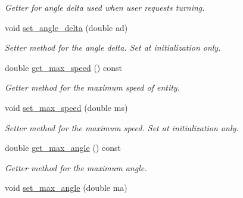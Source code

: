 \begin{DoxyCompactItemize}
\begin{DoxyCompactList}\small\item\em Getter for angle delta used when user requests turning. \end{DoxyCompactList}\item 
\mbox{\label{class_motion_handler_a8c2811ddf1a0f077fec829c460009286}} 
void \mbox{\hyperlink{class_motion_handler_a8c2811ddf1a0f077fec829c460009286}{set\+\_\+angle\+\_\+delta}} (double ad)
\begin{DoxyCompactList}\small\item\em Setter method for the angle delta. Set at initialization only. \end{DoxyCompactList}\item 
\mbox{\label{class_motion_handler_a71e2e4cdddfb8c49eb18cf41878a08c0}} 
double \mbox{\hyperlink{class_motion_handler_a71e2e4cdddfb8c49eb18cf41878a08c0}{get\+\_\+max\+\_\+speed}} () const
\begin{DoxyCompactList}\small\item\em Getter method for the maximum speed of entity. \end{DoxyCompactList}\item 
\mbox{\label{class_motion_handler_a32e832d35e73e9db85c16b3ff569196e}} 
void \mbox{\hyperlink{class_motion_handler_a32e832d35e73e9db85c16b3ff569196e}{set\+\_\+max\+\_\+speed}} (double ms)
\begin{DoxyCompactList}\small\item\em Setter method for the maximum speed. Set at initialization only. \end{DoxyCompactList}\item 
\mbox{\label{class_motion_handler_af6ef42cdbf31ec1589e14d5dfd639d79}} 
double \mbox{\hyperlink{class_motion_handler_af6ef42cdbf31ec1589e14d5dfd639d79}{get\+\_\+max\+\_\+angle}} () const
\begin{DoxyCompactList}\small\item\em Getter method for the maximum angle. \end{DoxyCompactList}\item 
\mbox{\label{class_motion_handler_aa73973c705626f1f95ac59391f23bcc9}} 
void \mbox{\hyperlink{class_motion_handler_aa73973c705626f1f95ac59391f23bcc9}{set\+\_\+max\+\_\+angle}} (double ma)

\end{DoxyCompactItemize}
